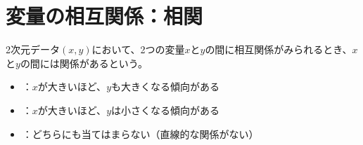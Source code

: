 \documentclass[../../../topic_statistics]{subfiles}
\begin{document}
\sectionline
\section{変量の相互関係：相関}

2次元データ$(x,y)$において、2つの変量$x$と$y$の間に相互関係がみられるとき、$x$と$y$の間には関係があるという。

\begin{itemize}
  \item {}：$x$が大きいほど、$y$も大きくなる傾向がある
  \item {}：$x$が大きいほど、$y$は小さくなる傾向がある
  \item {}：どちらにも当てはまらない（直線的な関係がない）
\end{itemize}
\end{document}
